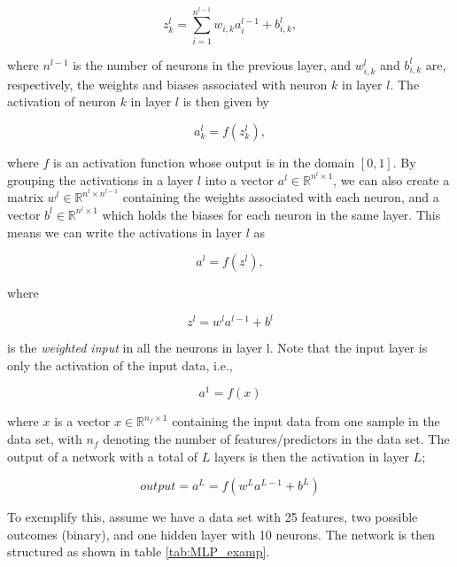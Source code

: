 \documentclass[a4paper,10pt,english]{article}
\begin{document}
$$z_k^l = \sum_{i=1}^{n^{l-1}} w_{i,k} a_i^{l-1} + b^l_{i,k},$$

where $n^{l-1}$ is the number of neurons in the previous layer, and $w^l_{i,k}$ and $b^l_{i,k}$ are, respectively, the weights and biases associated with neuron $k$ in layer $l$. The activation of neuron $k$ in layer $l$ is then given by

$$a^l_k = f(z^l_k),$$

where $f$ is an activation function whose output is in the domain $[0, 1]$. By grouping the activations in a layer $l$ into a vector $a^l \in \mathbb{R}^{n^l \times 1}$, we can also create a matrix $w^l \in \mathbb{R}^{n^l \times n^{l-1}}$ containing the weights associated with each neuron, and a vector $b^l \in \mathbb{R}^{n^l \times 1}$ which holds the biases for each neuron in the same layer. This means we can write the activations in layer $l$ as 

$$a^l = f(z^l),$$

where

$$z^l = w^l a^{l-1} + b^l$$

is the \textit{weighted input} in all the neurons in layer l. Note that the input layer is only the activation of the input data, i.e.,

$$a^1 = f(x)$$

where $x$ is a vector $x \in \mathbb{R}^{n_f \times 1}$ containing the input data from one sample in the data set, with $n_f$ denoting the number of features/predictors in the data set. The output of a network with a total of $L$ layers is then the activation in layer $L$;

$$output = a^L = f(w^L a^{L-1} + b^L)$$

To exemplify this, assume we have a data set with 25 features, two possible outcomes (binary), and one hidden layer with 10 neurons. The network is then structured as shown in table \ref{tab:MLP_examp}.
\end{document}
